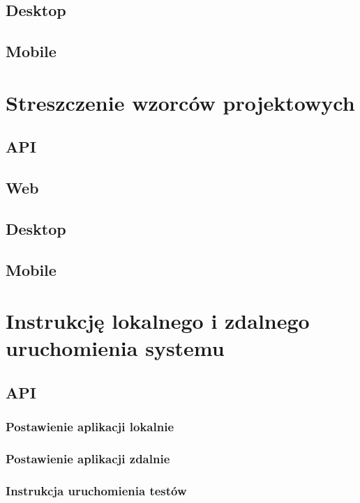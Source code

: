 \documentclass{article}
\begin{document}
        
    \subsection{Desktop}
    
    \subsection{Mobile}
    

\section{Streszczenie wzorców projektowych}
    \subsection{API}
       
        
    \subsection{Web}
        
        
    \subsection{Desktop}
    
    \subsection{Mobile}




\section{Instrukcję lokalnego i zdalnego uruchomienia systemu}
    \subsection{API}
        \subsubsection{Postawienie aplikacji lokalnie}
        \subsubsection{Postawienie aplikacji zdalnie}
        \subsubsection{Instrukcja uruchomienia testów}
\end{document}
